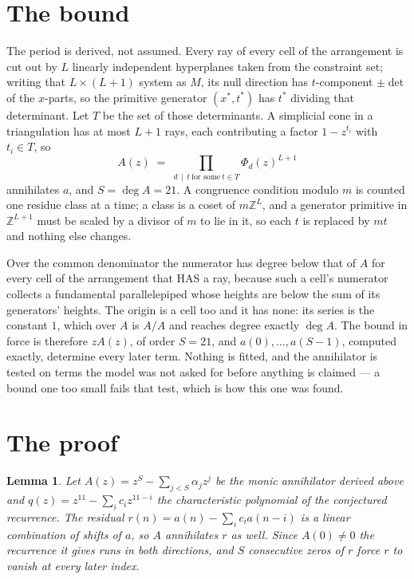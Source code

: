 \documentclass[11pt,a4paper]{article}
\theoremstyle{plain}
\newtheorem{lemma}[theorem]{Lemma}
\theoremstyle{definition}
\begin{document}
\section{The bound}

The period is derived, not assumed. Every ray of every cell of the arrangement is cut out by
$L$ linearly independent hyperplanes taken from the constraint set; writing that $L\times(L+1)$
system as $M$, its null direction has $t$-component $\pm\det$ of the $x$-parts, so the
primitive generator $(x^*,t^*)$ has $t^*$ dividing that determinant. Let $T$ be the set of
those determinants. A simplicial cone in a triangulation has at most $L+1$ rays, each
contributing a factor $1-z^{t_i}$ with $t_i\in T$, so
\[
A(z)\;=\;\prod_{d\,\mid\,t\ \text{for some}\ t\in T}\Phi_d(z)^{L+1}
\]
annihilates $a$, and $S=\deg A=21$. A congruence condition modulo $m$ is counted one residue
class at a time; a class is a coset of $m\mathbb{Z}^L$, and a generator primitive in
$\mathbb{Z}^{L+1}$ must be scaled by a divisor of $m$ to lie in it, so each $t$ is replaced
by $mt$ and nothing else changes.

Over the common denominator the numerator has degree below that of $A$ for every cell of the
arrangement that HAS a ray, because such a cell's numerator collects a fundamental
parallelepiped whose heights are below the sum of its generators' heights. The origin is a cell
too and it has none: its series is the constant $1$, which over $A$ is $A/A$ and reaches degree
exactly $\deg A$. The bound in force is therefore $zA(z)$, of order $S=21$, and
$a(0),\dots,a(S-1)$, computed exactly, determine every later term. Nothing is fitted, and the
annihilator is tested on terms the model was not asked for before anything is claimed --- a
bound one too small fails that test, which is how this one was found.

\section{The proof}

\begin{lemma}\label{lem:crit}
Let $A(z)=z^S-\sum_{j<S}\alpha_jz^{j}$ be the monic annihilator derived above and
$q(z)=z^{11}-\sum_ic_iz^{11-i}$ the characteristic polynomial of the conjectured
recurrence. The residual $r(n)=a(n)-\sum_ic_ia(n-i)$ is a linear combination of shifts of $a$,
so $A$ annihilates $r$ as well. Since $A(0)\ne0$ the recurrence it gives runs in both
directions, and $S$ consecutive zeros of $r$ force $r$ to vanish at every later index.
\end{lemma}
\end{document}
